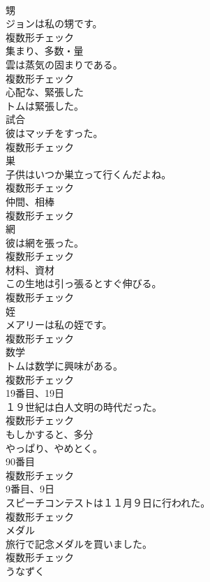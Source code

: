 \documentclass[8pt]{extreport}
\begin{document}
\begin{CJK}{UTF8}{min}
\\	[名詞]	甥	
\\	ジョンは私の甥です。	
\\	複数形チェック
\\	[名詞]	集まり、多数・量	
\\	雲は蒸気の固まりである。	
\\	複数形チェック
\\	[形容詞]	心配な、緊張した	
\\	トムは緊張した。	
\\	[名詞]	試合	
\\	彼はマッチをすった。	
\\	複数形チェック
\\	[名詞]	巣	
\\	子供はいつか巣立って行くんだよね。	
\\	複数形チェック
\\	[名詞]	仲間、相棒	
\\	複数形チェック
\\	[名詞]	網	
\\	彼は網を張った。	
\\	複数形チェック
\\	[名詞]	材料、資材	
\\	この生地は引っ張るとすぐ伸びる。	
\\	複数形チェック
\\	[名詞]	姪	
\\	メアリーは私の姪です。	
\\	複数形チェック
\\	[名詞]	数学	
\\	トムは数学に興味がある。	
\\	複数形チェック
\\	[名詞]	19番目、19日	
\\	１９世紀は白人文明の時代だった。	
\\	複数形チェック
\\	[副詞]	もしかすると、多分	
\\	やっぱり、やめとく。	
\\	[名詞]	90番目	
\\	複数形チェック
\\	[名詞]	9番目、9日	
\\	スピーチコンテストは１１月９日に行われた。	
\\	複数形チェック
\\	[名詞]	メダル	
\\	旅行で記念メダルを買いました。	
\\	複数形チェック
\\	[動詞]	うなずく	

\end{CJK}
\end{document}
